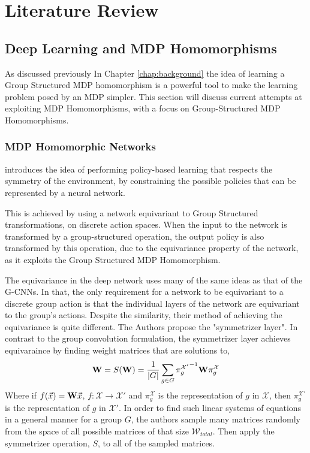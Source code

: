 \chapter{Literature Review}\label{chap:litreview}

\section{Deep Learning and MDP Homomorphisms}
As discussed previously In Chapter \ref{chap:background} the idea of learning a Group Structured MDP homomorphism is a powerful tool to make the learning problem posed by an MDP simpler. This section will discuss current attempts at exploiting MDP Homomorphisms, with a focus on Group-Structured MDP Homomorphisms.
\subsection{MDP Homomorphic Networks}
\cite{vanderpol2020mdp} introduces the idea of performing policy-based learning that respects the symmetry of the environment, by constraining the possible policies that can be represented by a neural network.

This is achieved by using a network equivariant to Group Structured transformations, on discrete action spaces. When the input to the network is transformed by a group-structured operation, the output policy is also transformed by this operation, due to the equivariance property of the network, as it exploits the Group Structured MDP Homomorphism.

The equivariance in the deep network uses many of the same ideas as that of the G-CNNs\cite{cohen2016group}. In that, the only requirement for a network to be equivariant to a discrete group action is that the individual layers of the network are equivariant to the group's actions. Despite the similarity, their method of achieving the equivariance is quite different. The Authors propose the "symmetrizer layer". In contrast to the group convolution formulation, the symmetrizer layer achieves equivaraince by finding weight matrices that are solutions to,
\begin{equation}
	\label{eqn:symmetrizer}
	\mathbf{W} =S(\mathbf{W}) = \frac{1}{|G|}\sum_{g\in G}{\pi_g^{\mathcal{X}'}}^{-1}\mathbf{W}\pi_g^{\mathcal{X}}
\end{equation}
Where if $f(\vec{x}) = \mathbf{W}\vec{x}$, $f: \mathcal{X} \rightarrow {\mathcal{X}'}$ and $\pi_g^{\mathcal{X}}$ is the representation of $g$ in $\mathcal{X}$, then $\pi_g^{\mathcal{X}'}$ is the representation of $g$ in $\mathcal{X}'$. In order to find such linear systems of equations in a general manner for a group $G$, the authors sample many matrices randomly from the space of all possible matrices of that size $\mathcal{W}_{total}$. Then apply the symmetrizer operation, $S$, to all of the sampled matrices.


